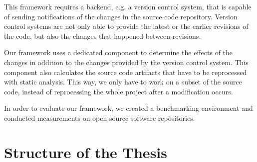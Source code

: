This framework requires a backend, e.g. a version control system, that is capable of sending notifications of the changes in the source code repository. Version control systems are not only able to provide the latest or the earlier revisions of the code, but also the changes that happened between revisions.

Our framework uses a dedicated component to determine the effects of the changes in addition to the changes provided by the version control system. This component also calculates the source code artifacts that have to be reprocessed with static analysis. This way, we only have to work on a subset of the source code, instead of reprocessing the whole project after a modification occurs.

In order to evaluate our framework, we created a benchmarking environment and conducted measurements on open-source software repositories.



\section{Structure of the Thesis}
